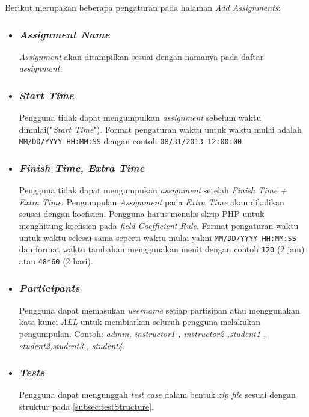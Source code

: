 Berikut merupakan beberapa pengaturan pada halaman \textit{Add Assignments}:
\begin{itemize}
\item \subsubsection{\textit{Assignment Name}}
\textit{Assignment} akan ditampilkan sesuai dengan namanya pada daftar \textit{assignment}.

\item \subsubsection{\textit{Start Time}}
Pengguna tidak dapat mengumpulkan \textit{assignment} sebelum waktu dimulai("\textit{Start Time}"). Format pengaturan waktu untuk waktu mulai adalah \verb|MM/DD/YYYY HH:MM:SS| dengan contoh \verb|08/31/2013 12:00:00|. 

\item \subsubsection{\textit{Finish Time, Extra Time}}
Pengguna tidak dapat mengumpukan \textit{assignment} setelah \textit{Finish Time + Extra Time}. Pengumpulan \textit{Assignment} pada \textit{Extra Time} akan dikalikan seusai dengan koefisien. Pengguna harus menulis skrip PHP untuk menghitung koefisien pada \textit{field Coefficient Rule}. Format pengaturan waktu untuk waktu selesai sama seperti waktu mulai yakni \verb|MM/DD/YYYY HH:MM:SS| dan format waktu tambahan menggunakan menit dengan contoh \verb|120| (2 jam) atau \verb|48*60| (2 hari).  

\item \subsubsection{\textit{Participants}}
Pengguna dapat memasukan \textit{username} setiap partisipan atau menggunakan kata kunci \textit{ALL} untuk membiarkan seluruh pengguna melakukan pengumpulan. Contoh: \textit{admin, instructor1 , instructor2 ,student1  ,   student2,student3 , student4}.

\item \subsubsection{\textit{Tests}}
Pengguna dapat mengunggah \textit{test case} dalam bentuk \textit{zip file} sesuai dengan struktur pada \ref{subsec:testStructure}.


\end{itemize}

